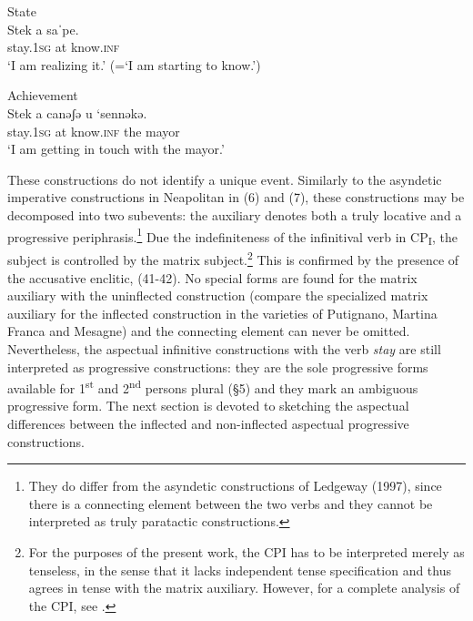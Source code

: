 \documentclass[output=paper]{langsci/langscibook}
\begin{document}
\ea%
         State\label{ex:lorusso:43}\\
    \gll Stek     a  saˈpe.     \\
         stay.\textsc{1sg} at  know.\textsc{inf}  \\
    \glt ‘I am realizing it.’ (=‘I am starting to know.’) 
\z


\ea%
         Achievement\label{ex:lorusso:44}\\
    \gll Stek     a  canəʃə   u  ‘sennəkə.\\
         stay.\textsc{1sg} at   know.\textsc{inf} the   mayor \\
    \glt ‘I am getting in touch with the mayor.’
\z

These constructions do not identify a unique event. Similarly to the asyndetic imperative constructions in Neapolitan \citep{Ledgeway1997} in (6) and (7), these constructions may be decomposed into two subevents: the auxiliary denotes both a truly locative and a progressive periphrasis.\footnote{They do differ from the asyndetic constructions of Ledgeway (1997), since there is a connecting element between the two verbs and they cannot be interpreted as truly paratactic constructions.} Due the indefiniteness of the infinitival verb in CP\textsubscript{I}, the subject is controlled by the matrix subject.\footnote{For the purposes of the present work, the CPI has to be interpreted merely as tenseless, in the sense that it lacks independent tense specification and thus agrees in tense with the matrix auxiliary. However, for a complete analysis of the CPI, see \citet{Manzini2005,Manzini2007,Manzini2011Bio}.} This is confirmed by the presence of the accusative enclitic, (41-42). No special forms are found for the matrix auxiliary with the uninflected construction (compare the specialized matrix auxiliary for the inflected construction in the varieties of Putignano, Martina Franca and Mesagne) and the connecting element can never be omitted. Nevertheless, the aspectual infinitive constructions with the verb \textit{stay} are still interpreted as progressive constructions: they are the sole progressive forms available for 1\textsuperscript{st} and 2\textsuperscript{nd} persons plural (§5) and they mark an ambiguous progressive form. The next section is devoted to sketching the aspectual differences between the inflected and non-inflected aspectual progressive constructions. 
\end{document}

